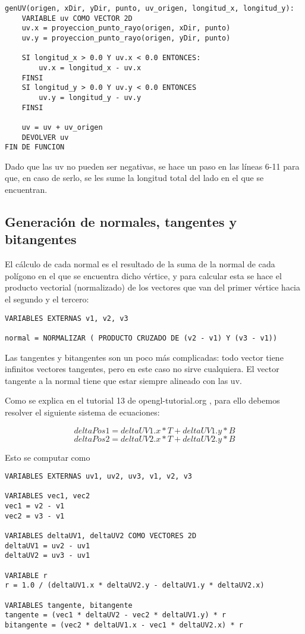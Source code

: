 \begin{lstlisting}
genUV(origen, xDir, yDir, punto, uv_origen, longitud_x, longitud_y):
    VARIABLE uv COMO VECTOR 2D
    uv.x = proyeccion_punto_rayo(origen, xDir, punto)
    uv.y = proyeccion_punto_rayo(origen, yDir, punto)
    
    SI longitud_x > 0.0 Y uv.x < 0.0 ENTONCES:
        uv.x = longitud_x - uv.x
    FINSI
    SI longitud_y > 0.0 Y uv.y < 0.0 ENTONCES
        uv.y = longitud_y - uv.y
    FINSI
    
    uv = uv + uv_origen
    DEVOLVER uv
FIN DE FUNCION
\end{lstlisting}

Dado que las uv no pueden ser negativas, se hace un paso en las líneas 6-11 para que, en caso de serlo, se les sume la longitud total del lado en el que se encuentran.

\subsection{Generación de normales, tangentes y bitangentes}
El cálculo de cada normal es el resultado de la suma de la normal de cada polígono en el que se encuentra dicho vértice, y para calcular esta se hace el producto vectorial (normalizado) de los vectores que van del primer vértice hacia el segundo y el tercero:

\begin{lstlisting}
VARIABLES EXTERNAS v1, v2, v3

normal = NORMALIZAR ( PRODUCTO CRUZADO DE (v2 - v1) Y (v3 - v1))
\end{lstlisting}

Las tangentes y bitangentes son un poco más complicadas: todo vector tiene infinitos vectores tangentes, pero en este caso no sirve cualquiera. El vector tangente a la normal tiene que estar siempre alineado con las uv.

Como se explica en el tutorial 13 de opengl-tutorial.org , para ello debemos resolver el siguiente sistema de ecuaciones:


\[ deltaPos1 = deltaUV1.x * T + deltaUV1.y * B \]
\[ deltaPos2 = deltaUV2.x * T + deltaUV2.y * B \]

Esto se computar como

\begin{lstlisting}
VARIABLES EXTERNAS uv1, uv2, uv3, v1, v2, v3

VARIABLES vec1, vec2
vec1 = v2 - v1
vec2 = v3 - v1

VARIABLES deltaUV1, deltaUV2 COMO VECTORES 2D
deltaUV1 = uv2 - uv1
deltaUV2 = uv3 - uv1

VARIABLE r
r = 1.0 / (deltaUV1.x * deltaUV2.y - deltaUV1.y * deltaUV2.x)

VARIABLES tangente, bitangente
tangente = (vec1 * deltaUV2 - vec2 * deltaUV1.y) * r
bitangente = (vec2 * deltaUV1.x - vec1 * deltaUV2.x) * r
\end{lstlisting}
